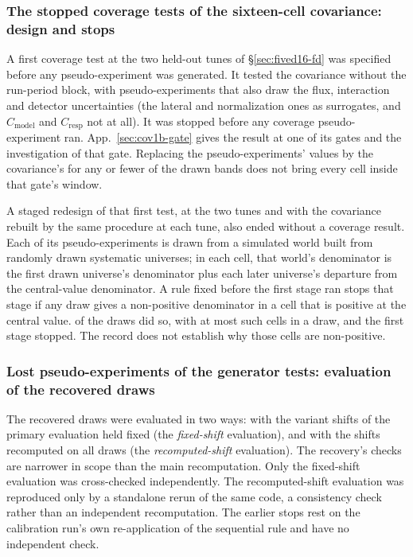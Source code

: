 \subsubsection{The stopped coverage tests of the sixteen-cell covariance: design and stops}
A first coverage test at the two held-out tunes of \S\ref{sec:fived16-fd} was specified before any pseudo-experiment was generated. It tested the covariance without the run-period block, with pseudo-experiments that also draw the flux, interaction and detector uncertainties (the lateral and normalization ones as surrogates, and $C_{\mathrm{model}}$ and $C_{\mathrm{resp}}$ not at all). It was stopped before any coverage pseudo-experiment ran. App.~\ref{sec:cov1b-gate} gives the result at one of its gates and the investigation of that gate. Replacing the pseudo-experiments' values by the covariance's for any  or fewer of the  drawn bands does not bring every cell inside that gate's window.

A staged redesign of that first test, at the two tunes and with the covariance rebuilt by the same procedure at each tune, also ended without a coverage result. Each of its pseudo-experiments is drawn from a simulated world built from randomly drawn systematic universes; in each cell, that world's denominator is the first drawn universe's denominator plus each later universe's departure from the central-value denominator. A rule fixed before the first stage ran stops that stage if any draw gives a non-positive denominator in a cell that is positive at the central value.  of the  draws did so, with at most  such cells in a draw, and the first stage stopped. The record does not establish why those cells are non-positive.

\subsubsection{Lost pseudo-experiments of the generator tests: evaluation of the recovered draws}
The recovered draws were evaluated in two ways: with the variant shifts of the primary evaluation held fixed (the \emph{fixed-shift} evaluation), and with the shifts recomputed on all draws (the \emph{recomputed-shift} evaluation). The recovery's checks are narrower in scope than the main recomputation. Only the fixed-shift evaluation was cross-checked independently. The recomputed-shift evaluation was reproduced only by a standalone rerun of the same code, a consistency check rather than an independent recomputation. The earlier stops rest on the calibration run's own re-application of the sequential rule and have no independent check.

